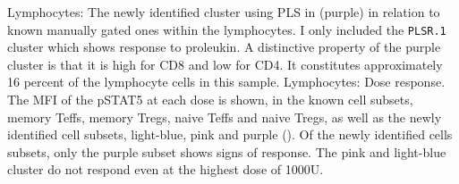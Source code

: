 { Lymphocytes: The newly identified cluster using \gls{PLS} in  (purple) in relation to known manually gated ones within the lymphocytes. }
{
    I only included the \texttt{PLSR.1} cluster which shows response to proleukin.
    A distinctive property of the purple cluster is that it is high for CD8 and low for CD4.
    It constitutes approximately 16 percent of the lymphocyte cells in this sample.
}
{ Lymphocytes: Dose response. }
{
    The MFI of the pSTAT5 at each dose is shown, in the known cell subsets, memory Teffs, memory Tregs, naive Teffs
    and naive Tregs, as well as the newly identified cell subsets, light-blue, pink and purple ().
    Of the newly identified cells subsets, only the purple subset shows signs of response.
    The pink and light-blue cluster do not respond even at the highest dose of 1000U.
}
\clearpage


